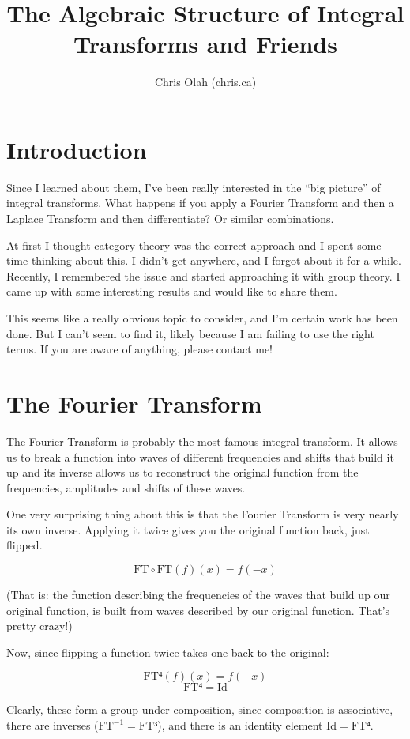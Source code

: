 \documentclass{article}
\title{The Algebraic Structure of Integral Transforms and Friends}
\author{Chris Olah (\hbox{chris\@colah.ca})}
\newcommand{\FT}{\text{FT}}
\newcommand{\Id}{\text{Id}}
\begin{document}
\maketitle

\section{Introduction}

Since I learned about them, I've been really interested in the ``big picture'' of integral transforms. What happens if you apply a Fourier Transform and then a Laplace Transform and then differentiate? Or similar combinations.

At first I thought category theory was the correct approach and I spent some time thinking about this. I didn't get anywhere, and I forgot about it for a while. Recently, I remembered the issue and started approaching it with group theory. I came up with some interesting results and would like to share them.

This seems like a really obvious topic to consider, and I'm certain work has been done. But I can't seem to find it,  likely because I am failing to use the right terms. If you are aware of anything, please contact me!

\section{The Fourier Transform}

The Fourier Transform is probably the most famous integral transform. It allows us to break a function into waves of different frequencies and shifts that build it up and its inverse allows us to reconstruct the original function from the frequencies, amplitudes and shifts of these waves.

One very surprising thing about this is that the Fourier Transform is very nearly its own inverse. Applying it twice gives you the original function back, just flipped.

$$\FT∘\FT(f)(x) = f(-x)$$

(That is: the function describing the frequencies of the waves that build up our original function, is built from waves described by our original function. That's pretty crazy!)

Now, since flipping a function twice takes one back to the original:

$$\FT⁴(f)(x) = f(-x)$$
$$\FT⁴ = \Id$$

Clearly, these form a group under composition, since composition is associative, there are inverses ($\FT^{-1} = \FT³$), and there is an identity element $\Id = \FT⁴$.
\end{document}
